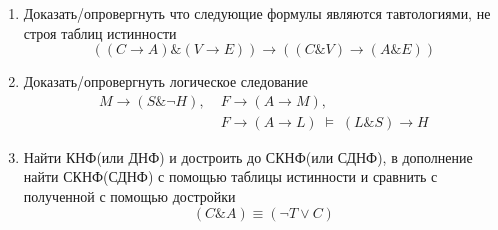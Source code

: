 \documentclass[10pt,a4paper]{article}
\begin{document}
\begin{multicols}{2}
\begin{enumerate}
\item Доказать/опровергнуть что следующие формулы являются тавтологиями, не строя таблиц истинности
$$((C\to A)\&(V\to E))\to((C\& V)\to(A\&E))$$
\item Доказать/опровергнуть логическое следование
\begin{equation*}\begin{split}M\to(S\&\neg H),\;& F\to (A\to M),\; \\& F\to(A\to L)\;\models\; (L\& S)\to H\end{split}\end{equation*}
\item Найти КНФ(или ДНФ) и достроить до СКНФ(или СДНФ), в дополнение найти СКНФ(СДНФ) с помощью таблицы истинности и сравнить с полученной с помощью достройки
$$(C\& A)\equiv(\neg T \vee C)$$
\end{enumerate}

\vfill\columnbreak


\end{multicols}
\end{document}
